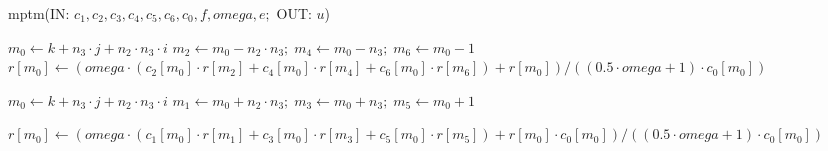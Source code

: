 \documentclass{article}
\begin{document}
 
 
\begin{algorithm}
\caption{mptm(IN: $c_1, c_2, c_3, c_4, c_5, c_6, c_0, f, omega, e;$ OUT: $u$)}\label{alg:mptm}
\begin{algorithmic}[1]
 
\State $m_0 \gets k + n_3 \cdot j + n_2 \cdot n_3 \cdot i$
\State $m_2 \gets m_0 - n_2 \cdot n_3;\; m_4 \gets m_0 - n_3;\; m_6 \gets m_0 - 1$
\State $r[m_0] \gets (omega \cdot (c_2[m_0] \cdot r[m_2] + c_4[m_0] \cdot r[m_4] + c_6[m_0] \cdot r[m_6]) + r[m_0]) / ((0.5 \cdot omega + 1) \cdot c_0[m_0]) $
\EndIf
\EndFor
\EndFor
\EndFor

\State $m_0 \gets k + n_3 \cdot j + n_2 \cdot n_3 \cdot i$
\State $m_1 \gets m_0 + n_2 \cdot n_3;\; m_3 \gets m_0 + n_3;\; m_5 \gets m_0 + 1$
\State \parbox[t]{\dimexpr\linewidth-\algorithmicindent-\algorithmicindent-\algorithmicindent-\algorithmicindent-\algorithmicindent}{$r[m_0] \gets (omega \cdot (c_1[m_0] \cdot r[m_1] + c_3[m_0] \cdot r[m_3] + c_5[m_0] \cdot r[m_5]) + r[m_0] \cdot c_0[m_0]) / ((0.5 \cdot omega + 1) \cdot c_0[m_0]) $}
\EndIf
\EndFor
\EndFor
\EndFor



\end{algorithmic}
\end{algorithm}
 
 
\end{document}
